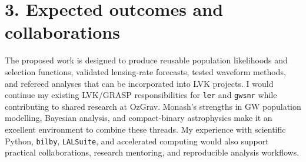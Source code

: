 \documentclass[11pt]{article}
\begin{document}
\section*{3. Expected outcomes and collaborations}
The proposed work is designed to produce reusable population likelihoods and selection functions, validated lensing-rate forecasts, tested waveform methods, and refereed analyses that can be incorporated into LVK projects. I would continue my existing LVK/GRASP responsibilities for \texttt{ler} and \texttt{gwsnr} while contributing to shared research at OzGrav. Monash's strengths in GW population modelling, Bayesian analysis, and compact-binary astrophysics make it an excellent environment to combine these threads. My experience with scientific Python, \texttt{bilby}, \texttt{LALSuite}, and accelerated computing would also support practical collaborations, research mentoring, and reproducible analysis workflows.
\end{document}
